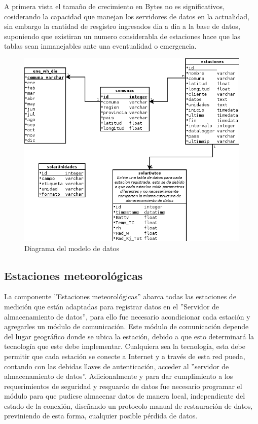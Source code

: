 A primera vista el tamaño de crecimiento en Bytes no es significativos, cosiderando la capacidad que manejan los servidores de datos en la actualidad, sin embargo la cantidad de resgistro ingresados dia a dia a la base de datos, suponiendo que existiran un numero considerabla de estaciones hace que las tablas sean inmanejables ante una eventualidad o emergencia.

\begin{figure}[h!]
        \centering
        \includegraphics[scale=0.6]{images/modeloDatos}
        \caption{Diagrama del modelo de datos}
        \label{modeloDatos}
\end{figure}

\subsection{Estaciones meteorológicas}
La componente ''Estaciones meteorológicas'' abarca todas las estaciones de medición que están adaptadas para registrar datos en el ''Servidor de almacenamiento de datos'', para ello fue necesario acondicionar cada estación y agregarles un módulo de comunicación. Este módulo de comunicación depende del lugar geográfico donde se ubica la estación, debido a que esto determinará la tecnología que este debe implementar. Cualquiera sea la tecnología, esta debe permitir que cada estación se conecte a Internet y a través de esta red pueda, contando con las debidas llaves de autenticación, acceder al ''servidor de almacenamiento de datos''. Adicionalmente y para dar cumplimiento a los requerimientos de seguridad y resguardo de datos fue necesario programar el módulo para que pudiese almacenar datos de manera local, independiente del estado de la conexión, diseñando un protocolo manual de restauración de datos, previniendo de esta forma, cualquier posible pérdida de datos.\\


